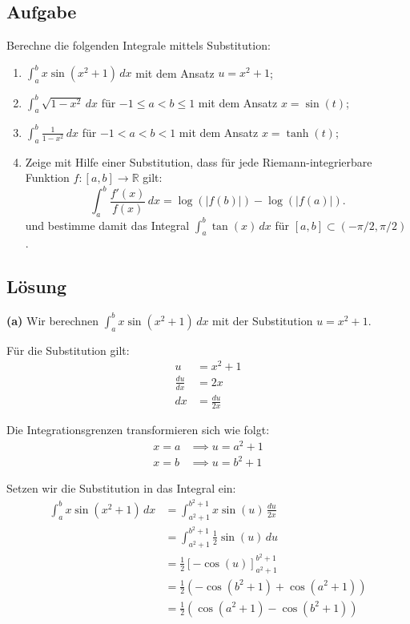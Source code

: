\documentclass{article}
\begin{document}
\subsection*{Aufgabe}
Berechne die folgenden Integrale mittels Substitution:
\begin{enumerate}
\item $\int_a^b x\sin(x^2+1)\,dx$ mit dem Ansatz $u=x^2+1$;
\item $\int_a^b \sqrt{1-x^2}\,dx$ für $-1\leq a<b\leq1$ mit dem Ansatz $x=\sin(t)$;
\item $\int_a^b\frac{1}{1-x^2}\,dx$ für $-1<a<b<1$ mit dem Ansatz $x=\tanh(t)$;
\item Zeige mit Hilfe einer Substitution, dass für jede Riemann-integrierbare Funktion $f:[a,b]\to\mathbb{R}$ gilt:
$$
\int_a^b\frac{f'(x)}{f(x)}\,dx = \log(|f(b)|)- \log(|f(a)|).
$$
 und bestimme damit das Integral $\int_a^b\tan(x)\,dx$ für $[a,b]\subset(-\pi/2,\pi/2)$.
\end{enumerate} 

\subsection*{Lösung}

\textbf{(a)} Wir berechnen $\int_a^b x\sin(x^2+1)\,dx$ mit der Substitution $u=x^2+1$.

Für die Substitution gilt:
\begin{align}
u &= x^2 + 1\\
\frac{du}{dx} &= 2x\\
dx &= \frac{du}{2x}
\end{align}

Die Integrationsgrenzen transformieren sich wie folgt:
\begin{align}
x = a &\implies u = a^2 + 1\\
x = b &\implies u = b^2 + 1
\end{align}

Setzen wir die Substitution in das Integral ein:
\begin{align}
\int_a^b x\sin(x^2+1)\,dx &= \int_{a^2+1}^{b^2+1} x\sin(u)\,\frac{du}{2x}\\
&= \int_{a^2+1}^{b^2+1} \frac{1}{2}\sin(u)\,du\\
&= \frac{1}{2}\left[-\cos(u)\right]_{a^2+1}^{b^2+1}\\
&= \frac{1}{2}\left(-\cos(b^2+1) + \cos(a^2+1)\right)\\
&= \frac{1}{2}\left(\cos(a^2+1) - \cos(b^2+1)\right)
\end{align}
\end{document}

